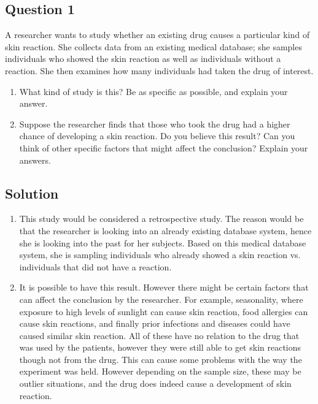 \documentclass[12pt,a4paper]{article}
\author{Ravish Kamath}
\makeatletter
\newenvironment{folding}{\endgroup}{\begingroup \def \@currenvir{folding}\edef \@currenvline{\on@line}}
\makeatother
\begin{document}
	\begin{folding}
		\begin{centering}
			\subsection*{Question 1}
		\end{centering}
		\noindent
		A researcher wants to study whether an existing drug causes a particular kind of skin reaction. She collects data from an existing medical database; she samples individuals who showed the skin reaction as well as individuals without a reaction. She then examines how many individuals had taken the drug of interest.\\
			\begin{enumerate} [label = (\alph*)]
				\item  What kind of study is this? Be as specific as possible, and explain your answer.
				\item  Suppose the researcher finds that those who took the drug had a higher chance of developing a skin reaction. Do you believe this result? Can you think of other specific factors that might affect the conclusion? Explain your answers.
		\end{enumerate}
		\begin{centering}
			\subsection*{Solution}
		\end{centering}
		\begin{enumerate} [label=(\alph*)]
			\item  This study would be considered a retrospective study. The reason would be that the researcher is looking into an already existing database system, hence she is looking into the past for her subjects. Based on this medical database system, she is sampling individuals who already showed a skin reaction vs. individuals that did not have a reaction. \\
			\item  It is possible to have this result. However there might be certain factors that can  affect the conclusion by the researcher. For example, seasonality, where exposure to high levels of sunlight can cause skin reaction, food allergies can cause skin reactions, and finally prior infections and diseases could have caused similar skin reaction. All of these have no relation to the drug that was used by the patients, however they were still able to get skin reactions though not from the drug. This can cause some problems with the way the experiment was held. However depending on the sample size, these may be outlier situations, and the drug does indeed cause a development of skin reaction.
		\end{enumerate}
	\newpage
	\end{folding}
\end{document}
